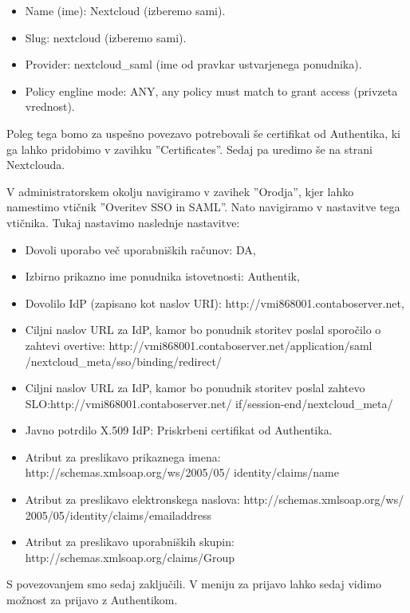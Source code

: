 \documentclass[a4paper,12pt,openright,oneside]{book}
\begin{document}
\begin{itemize}
    \item Name (ime): Nextcloud (izberemo sami).
    \item Slug: nextcloud (izberemo sami).
    \item Provider: nextcloud\_saml (ime od pravkar ustvarjenega ponudnika).
    \item Policy engline mode: ANY, any policy must match to grant access (privzeta vrednost). 
\end{itemize}

Poleg tega bomo za uspešno povezavo potrebovali še certifikat od Authentika, ki ga lahko pridobimo v zavihku ''Certificates''. Sedaj pa uredimo še na strani Nextclouda.

V administratorskem okolju navigiramo v zavihek ''Orodja'', kjer lahko namestimo vtičnik ''Overitev SSO in SAML''. Nato navigiramo v nastavitve tega vtičnika. Tukaj nastavimo naslednje nastavitve:

\begin{itemize}
    \item Dovoli uporabo več uporabniških računov: DA,
    \item Izbirno prikazno ime ponudnika istovetnosti: Authentik,
    \item Dovolilo IdP (zapisano kot naslov URI): http://vmi868001.contaboserver.net,
    \item Ciljni naslov URL za IdP, kamor bo ponudnik storitev poslal sporočilo o zahtevi overtive: http://vmi868001.contaboserver.net/application/saml
    /nextcloud\_meta/sso/binding/redirect/
    \item Ciljni naslov URL za IdP, kamor bo ponudnik storitev poslal zahtevo SLO:http://vmi868001.contaboserver.net/
    if/session-end/nextcloud\_meta/
    \item Javno potrdilo X.509 IdP: Priskrbeni certifikat od Authentika. 
    \item Atribut za preslikavo prikaznega imena: http://schemas.xmlsoap.org/ws/2005/05/
    identity/claims/name
    \item Atribut za preslikavo elektronskega naslova: http://schemas.xmlsoap.org/ws/
    2005/05/identity/claims/emailaddress
    \item Atribut za preslikavo uporabniških skupin: http://schemas.xmlsoap.org/claims/Group
\end{itemize}

S povezovanjem smo sedaj zaključili. V meniju za prijavo lahko sedaj vidimo možnost za prijavo z Authentikom.
\end{document}
